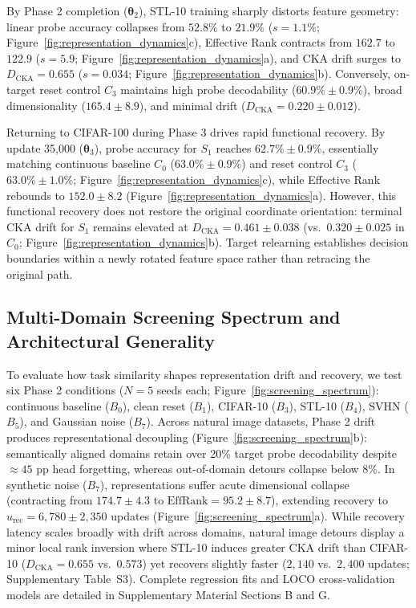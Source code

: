 \documentclass[10pt]{article}
\newcommand{\EffRank}{\mathrm{EffRank}}
\newcommand{\Dcka}{D_{\mathrm{CKA}}}
\begin{document}
By Phase 2 completion ($\bm{\theta}_2$), STL-10 training sharply distorts feature geometry: linear probe accuracy collapses from $52.8\%$ to $21.9\%$ ($s = 1.1\%$; Figure~\ref{fig:representation_dynamics}c), Effective Rank contracts from $162.7$ to $122.9$ ($s = 5.9$; Figure~\ref{fig:representation_dynamics}a), and CKA drift surges to $\Dcka = 0.655$ ($s = 0.034$; Figure~\ref{fig:representation_dynamics}b). Conversely, on-target reset control $C_3$ maintains high probe decodability ($60.9\% \pm 0.9\%$), broad dimensionality ($165.4 \pm 8.9$), and minimal drift ($\Dcka = 0.220 \pm 0.012$).

Returning to CIFAR-100 during Phase 3 drives rapid functional recovery. By update 35,000 ($\bm{\theta}_3$), probe accuracy for $S_1$ reaches $62.7\% \pm 0.9\%$, essentially matching continuous baseline $C_0$ ($63.0\% \pm 0.9\%$) and reset control $C_3$ ($63.0\% \pm 1.0\%$; Figure~\ref{fig:representation_dynamics}c), while Effective Rank rebounds to $152.0 \pm 8.2$ (Figure~\ref{fig:representation_dynamics}a). However, this functional recovery does not restore the original coordinate orientation: terminal CKA drift for $S_1$ remains elevated at $\Dcka = 0.461 \pm 0.038$ (vs.\ $0.320 \pm 0.025$ in $C_0$; Figure~\ref{fig:representation_dynamics}b). Target relearning establishes decision boundaries within a newly rotated feature space rather than retracing the original path.

\subsection{Multi-Domain Screening Spectrum and Architectural Generality}\label{subsec:results_screening_spectrum}

To evaluate how task similarity shapes representation drift and recovery, we test six Phase 2 conditions ($N = 5$ seeds each; Figure~\ref{fig:screening_spectrum}): continuous baseline ($B_0$), clean reset ($B_1$), CIFAR-10 ($B_3$), STL-10 ($B_4$), SVHN ($B_5$), and Gaussian noise ($B_7$). Across natural image datasets, Phase 2 drift produces representational decoupling (Figure~\ref{fig:screening_spectrum}b): semantically aligned domains retain over 20\% target probe decodability despite $\approx 45$ pp head forgetting, whereas out-of-domain detours collapse below 8\%. In synthetic noise ($B_7$), representations suffer acute dimensional collapse (contracting from $174.7 \pm 4.3$ to $\EffRank = 95.2 \pm 8.7$), extending recovery to $u_{\mathrm{rec}} = 6{,}780 \pm 2{,}350$ updates (Figure~\ref{fig:screening_spectrum}a). While recovery latency scales broadly with drift across domains, natural image detours display a minor local rank inversion where STL-10 induces greater CKA drift than CIFAR-10 ($\Dcka = 0.655$ vs.\ $0.573$) yet recovers slightly faster ($2{,}140$ vs.\ $2{,}400$ updates; Supplementary Table~S3). Complete regression fits and LOCO cross-validation models are detailed in Supplementary Material Sections B and G.
\end{document}
